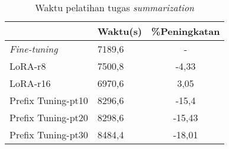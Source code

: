 \begin{table}[h]
    \centering
    \caption{Waktu pelatihan tugas \textit{summarization}}
    \label{table:runtime-summarization}
    \begin{tabular}{|l|l|c|}
        \hline \rowcolor{black!10}
        \multicolumn{1}{|c|}{\textbf{Metode}} & \multicolumn{1}{|c|}{\textbf{Waktu(s)}} & \textbf{\%Peningkatan} \\ \hline
        \textit{Fine-tuning} & 7189,6 & -  \\ \hline
        LoRA-r8 & 7500,8 & -4,33 \\ \hline
        LoRA-r16 & 6970,6 & 3,05 \\ \hline
        Prefix Tuning-pt10 & 8296,6 & -15,4 \\ \hline
        Prefix Tuning-pt20 & 8298,6 & -15,43 \\ \hline
        Prefix Tuning-pt30 & 8484,4 & -18,01 \\ \hline
    \end{tabular}
\end{table}
